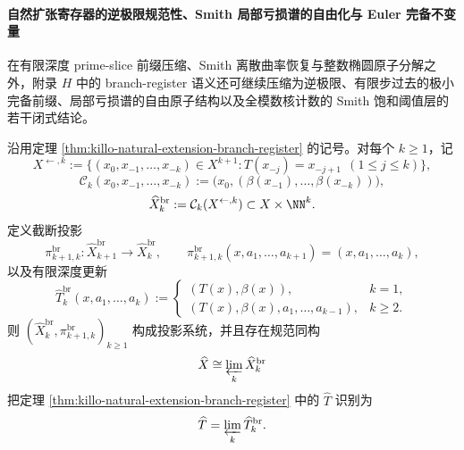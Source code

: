 \paragraph{自然扩张寄存器的逆极限规范性、Smith 局部亏损谱的自由化与 Euler 完备不变量}
在有限深度 prime-slice 前缀压缩、Smith 离散曲率恢复与整数椭圆原子分解之外，附录 \(H\) 中的 branch-register 语义还可继续压缩为逆极限、有限步过去的极小完备前缀、局部亏损谱的自由原子结构以及全模数核计数的 Smith 饱和阈值层的若干闭式结论。

\begin{theorem}[自然扩张分支寄存器系统是有限深度截断的严格逆极限]\label{thm:xi-branch-register-strict-inverse-limit}
沿用定理 \ref{thm:killo-natural-extension-branch-register} 的记号。对每个 \(k\ge 1\)，记
\[
X^{\leftarrow,k}
:=
\{(x_0,x_{-1},\dots,x_{-k})\in X^{k+1}:T(x_{-j})=x_{-j+1}\ \ (1\le j\le k)\},
\]
\[
\mathcal C_k(x_0,x_{-1},\dots,x_{-k})
:=
\bigl(x_0,(\beta(x_{-1}),\dots,\beta(x_{-k}))\bigr),
\]
\[
\widehat X_k^{\mathrm{br}}
:=
\mathcal C_k(X^{\leftarrow,k})
\subset X\times \NN^k.
\]
定义截断投影
\[
\pi_{k+1,k}^{\mathrm{br}}:\widehat X_{k+1}^{\mathrm{br}}\to \widehat X_k^{\mathrm{br}},
\qquad
\pi_{k+1,k}^{\mathrm{br}}(x,a_1,\dots,a_{k+1})=(x,a_1,\dots,a_k),
\]
以及有限深度更新
\[
\widehat T_k^{\mathrm{br}}(x,a_1,\dots,a_k)
:=
\begin{cases}
(T(x),\beta(x)),& k=1,\\
(T(x),\beta(x),a_1,\dots,a_{k-1}),& k\ge 2.
\end{cases}
\]
则 \((\widehat X_k^{\mathrm{br}},\pi_{k+1,k}^{\mathrm{br}})_{k\ge 1}\) 构成投影系统，并且存在规范同构
\[
\widehat X
\cong
\varprojlim_{k}\widehat X_k^{\mathrm{br}}
\]
把定理 \ref{thm:killo-natural-extension-branch-register} 中的 \(\widehat T\) 识别为
\[
\widehat T
=
\varprojlim_{k}\widehat T_k^{\mathrm{br}}.
\]
\end{theorem}
